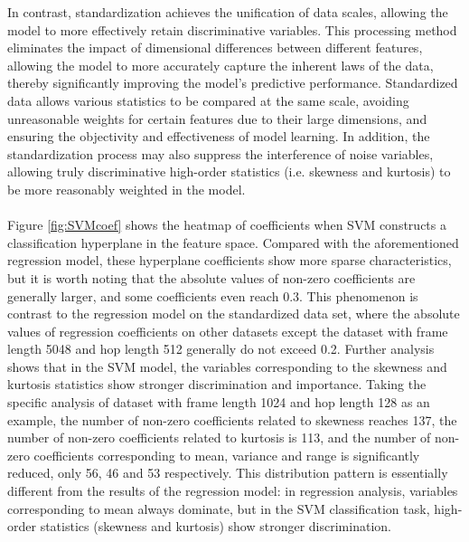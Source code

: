 In contrast, standardization achieves the unification of data scales, allowing the model to more effectively retain discriminative variables. This processing method eliminates the impact of dimensional differences between different features, allowing the model to more accurately capture the inherent laws of the data, thereby significantly improving the model's predictive performance. Standardized data allows various statistics to be compared at the same scale, avoiding unreasonable weights for certain features due to their large dimensions, and ensuring the objectivity and effectiveness of model learning. In addition, the standardization process may also suppress the interference of noise variables, allowing truly discriminative high-order statistics (i.e. skewness and kurtosis) to be more reasonably weighted in the model.\\
\\
Figure \ref{fig:SVMcoef} shows the heatmap of coefficients when SVM constructs a classification hyperplane in the feature space. Compared with the aforementioned regression model, these hyperplane coefficients show more sparse characteristics, but it is worth noting that the absolute values of non-zero coefficients are generally larger, and some coefficients even reach 0.3. This phenomenon is contrast to the regression model on the standardized data set, where the absolute values of regression coefficients on other datasets except the dataset with frame length 5048 and hop length 512 generally do not exceed 0.2. Further analysis shows that in the SVM model, the variables corresponding to the skewness and kurtosis statistics show stronger discrimination and importance. Taking the specific analysis of dataset with frame length 1024 and hop length 128 as an example, the number of non-zero coefficients related to skewness reaches 137, the number of non-zero coefficients related to kurtosis is 113, and the number of non-zero coefficients corresponding to mean, variance and range is significantly reduced, only 56, 46 and 53 respectively. This distribution pattern is essentially different from the results of the regression model: in regression analysis, variables corresponding to mean always dominate, but in the SVM classification task, high-order statistics (skewness and kurtosis) show stronger discrimination.\\
\\
